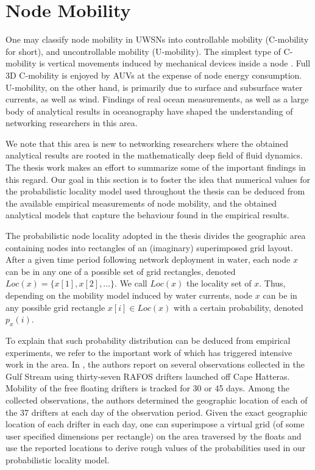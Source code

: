 \section{Node Mobility}
\label{ch1:wounmm}

One may classify node mobility in UWSNs into controllable mobility (C-mobility for short), and uncontrollable mobility (U-mobility).
The simplest type of C-mobility is vertical movements induced by mechanical devices inside a node \cite{erol2008multi, Erol:2007}.
Full 3D C-mobility is enjoyed by AUVs at the expense of node energy consumption.
U-mobility, on the other hand, is primarily due to surface and subsurface water currents, as well as wind.
Findings of real ocean measurements, as well as a large body of analytical results in oceanography have shaped the understanding of networking researchers in this area.


We note that this area is new to networking researchers where the obtained analytical results are rooted in the mathematically deep field of fluid dynamics.
The thesis work makes an effort to summarize some of the important findings in this regard.
Our goal in this section is to foster the idea that numerical values for the probabilistic locality model used throughout the thesis can be deduced from the available empirical measurements of node mobility, and the obtained analytical models that capture the behaviour found in the empirical results.


The probabilistic node locality adopted in the thesis divides the geographic area containing nodes into rectangles of an (imaginary) superimposed grid layout.
After a given time period following network deployment in water, each node $x$ can be in any one of a possible set of grid rectangles, denoted $Loc(x) = \{x[1], x[2],\ldots\}$.
We call $Loc(x)$ the locality set of $x$. 
Thus, depending on the mobility model induced by water currents, node $x$ can be in any possible grid rectangle $x[i]\in Loc(x)$ with a certain probability, denoted $p_x(i)$.


To explain that such probability distribution can be deduced from empirical experiments, we refer to the important work of \cite{bower1989evidence} which has triggered intensive work in the area.
In \cite{bower1989evidence}, the authors report on several observations collected in the Gulf Stream using thirty-seven RAFOS drifters launched off Cape Hatteras.
Mobility of the free floating drifters is tracked for 30 or 45 days.
Among the collected observations, the authors determined the geographic location of each of the 37 drifters at each day of the observation period.
Given the exact geographic location of each drifter in each day, one can superimpose a virtual grid (of some user specified dimensions per rectangle) on the area traversed by the floats and use the reported locations to derive rough values of the probabilities used in our probabilistic locality model.


